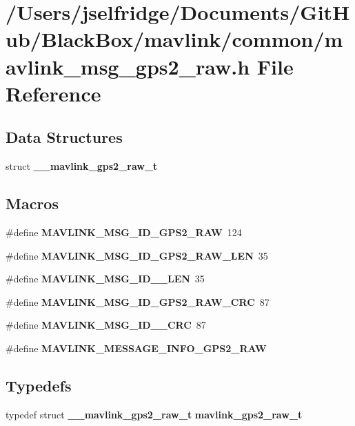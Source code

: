 \section{/\+Users/jselfridge/\+Documents/\+Git\+Hub/\+Black\+Box/mavlink/common/mavlink\+\_\+msg\+\_\+gps2\+\_\+raw.h File Reference}
\label{mavlink__msg__gps2__raw_8h}
\subsection*{Data Structures}
\begin{DoxyCompactItemize}
\item 
struct \textbf{ \+\_\+\+\_\+mavlink\+\_\+gps2\+\_\+raw\+\_\+t}
\end{DoxyCompactItemize}
\subsection*{Macros}
\begin{DoxyCompactItemize}
\item 
\#define \textbf{ M\+A\+V\+L\+I\+N\+K\+\_\+\+M\+S\+G\+\_\+\+I\+D\+\_\+\+G\+P\+S2\+\_\+\+R\+AW}~124
\item 
\#define \textbf{ M\+A\+V\+L\+I\+N\+K\+\_\+\+M\+S\+G\+\_\+\+I\+D\+\_\+\+G\+P\+S2\+\_\+\+R\+A\+W\+\_\+\+L\+EN}~35
\item 
\#define \textbf{ M\+A\+V\+L\+I\+N\+K\+\_\+\+M\+S\+G\+\_\+\+I\+D\+\_\+\_\+\+L\+EN}~35
\item 
\#define \textbf{ M\+A\+V\+L\+I\+N\+K\+\_\+\+M\+S\+G\+\_\+\+I\+D\+\_\+\+G\+P\+S2\+\_\+\+R\+A\+W\+\_\+\+C\+RC}~87
\item 
\#define \textbf{ M\+A\+V\+L\+I\+N\+K\+\_\+\+M\+S\+G\+\_\+\+I\+D\+\_\+\_\+\+C\+RC}~87
\item 
\#define \textbf{ M\+A\+V\+L\+I\+N\+K\+\_\+\+M\+E\+S\+S\+A\+G\+E\+\_\+\+I\+N\+F\+O\+\_\+\+G\+P\+S2\+\_\+\+R\+AW}
\end{DoxyCompactItemize}
\subsection*{Typedefs}
\begin{DoxyCompactItemize}
\item 
typedef struct \textbf{ \+\_\+\+\_\+mavlink\+\_\+gps2\+\_\+raw\+\_\+t} \textbf{ mavlink\+\_\+gps2\+\_\+raw\+\_\+t}
\end{DoxyCompactItemize}


